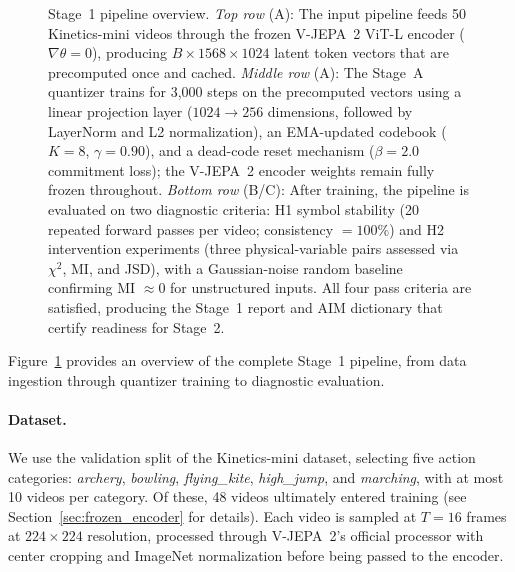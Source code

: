 \documentclass{article}
\begin{document}
\begin{figure}[H]
\caption{Stage~1 pipeline overview.
         \textit{Top row} (A): The input pipeline feeds 50 Kinetics-mini
         videos through the frozen V-JEPA~2 ViT-L encoder
         ($\nabla\theta = 0$), producing $B \times 1568 \times 1024$
         latent token vectors that are precomputed once and cached.
         \textit{Middle row} (A): The Stage~A quantizer trains for 3,000
         steps on the precomputed vectors using a linear projection layer
         ($1024 \to 256$ dimensions, followed by LayerNorm and L2
         normalization), an EMA-updated codebook ($K = 8$,
         $\gamma = 0.90$), and a dead-code reset mechanism
         ($\beta = 2.0$ commitment loss); the V-JEPA~2 encoder weights
         remain fully frozen throughout.
         \textit{Bottom row} (B/C): After training, the pipeline is
         evaluated on two diagnostic criteria: H1 symbol stability
         (20 repeated forward passes per video; consistency $= 100\%$)
         and H2 intervention experiments (three physical-variable pairs
         assessed via $\chi^2$, MI, and JSD), with a Gaussian-noise
         random baseline confirming MI $\approx 0$ for unstructured
         inputs.  All four pass criteria are satisfied, producing the
         Stage~1 report and AIM dictionary that certify readiness for
         Stage~2.}
  \label{fig:pipeline_overview}
\end{figure}

Figure~\ref{fig:pipeline_overview} provides an overview of the
complete Stage~1 pipeline, from data ingestion through quantizer
training to diagnostic evaluation.

\paragraph{Dataset.}
We use the validation split of the Kinetics-mini dataset, selecting five action
categories: \textit{archery}, \textit{bowling}, \textit{flying\_kite},
\textit{high\_jump}, and \textit{marching}, with at most 10 videos per category.
Of these, 48 videos ultimately entered training (see Section~\ref{sec:frozen_encoder} for details).
Each video is sampled at $T = 16$ frames at $224\times224$ resolution, processed
through V-JEPA~2's official processor with center cropping and ImageNet
normalization before being passed to the encoder.
\end{document}
